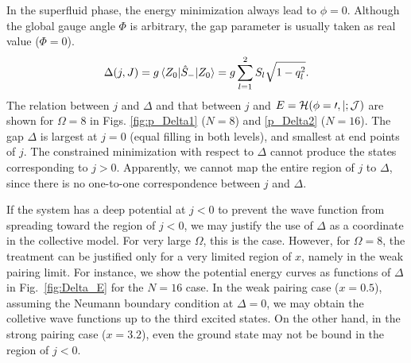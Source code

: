 \documentclass[%
superscriptaddress,
preprint,
showpacs,
nofootinbib,
amsmath,amssymb,
prc,
floatfix ]%
{revtex4-1}
\begin{document}

In the superfluid phase, the energy minimization always lead to $\phi=0$.
Although the global gauge angle $\Phi$ is arbitrary,
the gap parameter is usually taken as real value ($\Phi=0$).
\begin{align}
\Delta(j,J) = g\braket{Z_0|\hat{S}_-|Z_0} %
	= g\sum_{l=1}^2 S_l\sqrt{1-q_l^2} . %
 \label{Delta_BCS}
\end{align}
The relation between $j$ and $\Delta$ 
and that between $j$ and $E=\cal{H}(\phi=0,j;J)$
are shown for $\Omega=8$
in Figs. \ref{fig:p_Delta1} ($N=8$) and \ref{p_Delta2} ($N=16$).
The gap $\Delta$ is largest at $j=0$ (equal filling in both levels),
and smallest at end points of $j$.
The constrained minimization with respect to $\Delta$ cannot 
produce the states corresponding to $j>0$.
Apparently, we cannot map the entire region of $j$ to $\Delta$,
since there is no one-to-one correspondence between $j$ and $\Delta$.

If the system has a deep potential at $j<0$ to prevent the wave function
from spreading toward the region of $j<0$,
we may justify the use of $\Delta$ as a coordinate in
the collective model.
For very large $\Omega$, this is the case.
However, for $\Omega=8$, the treatment can be justified only for
a very limited region of $x$, namely in the weak pairing limit.
For instance, we show the potential energy curves as functions of $\Delta$
in Fig.~\ref{fig:Delta_E} for the $N=16$ case.
In the weak pairing case ($x=0.5$),
assuming the Neumann boundary condition at $\Delta=0$,
we may obtain the colletive wave functions up to the third excited states.
On the other hand, in the strong pairing case ($x=3.2$), 
even the ground state may not be bound in the region of $j<0$.
\end{document}
